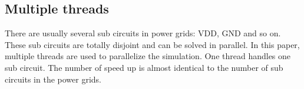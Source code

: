   \subsection{Multiple threads}
There are usually several sub circuits in power grids: VDD, GND and so on. These sub circuits are totally disjoint and can be solved
in parallel. In this paper, multiple threads are used to parallelize the simulation. One thread handles one sub circuit. The number of
speed up is almost identical to the number of sub circuits in the power grids.
